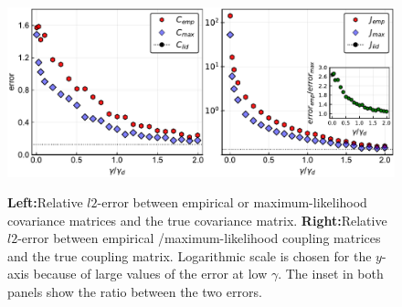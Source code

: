 \documentclass[preprint,amsmath,amssymb,superscriptaddress,showpacs,pre]{revtex4-1}
\providecommand{\DIFadd}[1]{{\protect\color{blue}\uwave{#1}}} %
\providecommand{\DIFdel}[1]{{\protect\color{red}\sout{#1}}}                      %
\providecommand{\DIFaddFL}[1]{\DIFadd{#1}} %
\providecommand{\DIFdelFL}[1]{\DIFdel{#1}} %
\providecommand{\DIFaddbeginFL}{} %
\providecommand{\DIFaddendFL}{} %
\providecommand{\DIFdelbeginFL}{} %
\providecommand{\DIFdelendFL}{} %
\newcommand{\DIFscaledelfig}{0.5}
\newlength{\DIFdelgraphicswidth} %
\newlength{\DIFdelgraphicsheight} %
\newcommand{\DIFaddincludegraphics}[2][]{{\color{blue}\fbox{\DIFOincludegraphics[#1]{#2}}}} %
\newcommand{\DIFdelincludegraphics}[2][]{%
\sbox{\DIFdelgraphicsbox}{\DIFOincludegraphics[#1]{#2}}%
\settoboxwidth{\DIFdelgraphicswidth}{\DIFdelgraphicsbox} %
\settoboxtotalheight{\DIFdelgraphicsheight}{\DIFdelgraphicsbox} %
\scalebox{\DIFscaledelfig}{%
\parbox[b]{\DIFdelgraphicswidth}{\usebox{\DIFdelgraphicsbox}\\[-\baselineskip] \rule{\DIFdelgraphicswidth}{0em}}\llap{\resizebox{\DIFdelgraphicswidth}{\DIFdelgraphicsheight}{%
\setlength{\unitlength}{\DIFdelgraphicswidth}%
\begin{picture}(1,1)%
\thicklines\linethickness{2pt} %
{\color[rgb]{1,0,0}\put(0,0){\framebox(1,1){}}}%
{\color[rgb]{1,0,0}\put(0,0){\line( 1,1){1}}}%
{\color[rgb]{1,0,0}\put(0,1){\line(1,-1){1}}}%
\end{picture}%
}\hspace*{3pt}}} %
} %
\DeclareRobustCommand{\DIFaddbeginFL}{\DIFOaddbeginFL \let\includegraphics\DIFaddincludegraphics} %
\DeclareRobustCommand{\DIFaddendFL}{\DIFOaddendFL \let\includegraphics\DIFOincludegraphics} %
\DeclareRobustCommand{\DIFdelbeginFL}{\DIFOdelbeginFL \let\includegraphics\DIFdelincludegraphics} %
\DeclareRobustCommand{\DIFdelendFL}{\DIFOaddendFL \let\includegraphics\DIFOincludegraphics} %
\begin{document}
\begin{figure}[!htb]
	\DIFdelbeginFL %
\DIFdelFL{\hspace{1mm}
	}%
\DIFdelendFL %
			\centering\DIFdelbeginFL %
\DIFdelendFL \DIFaddbeginFL \includegraphics[keepaspectratio=true,width=1.0\textwidth]{Figures/epsilon_error_L4_balanced_tree_100.pdf}
		\DIFaddFL{\hspace{1mm}
	}\DIFaddendFL \caption{\textbf{Left:}Relative $l2$-error between empirical or maximum-likelihood  covariance matrices and the true covariance matrix.  \textbf{Right:}Relative $l2$-error between empirical /maximum-likelihood  coupling matrices and the true coupling matrix. Logarithmic scale is chosen for the $y$-axis because of large values of the error at low $\gamma$. The inset in both panels show the ratio between the two errors.}
	\label{fig:error_1_L4}
\end{figure}
\end{document}

